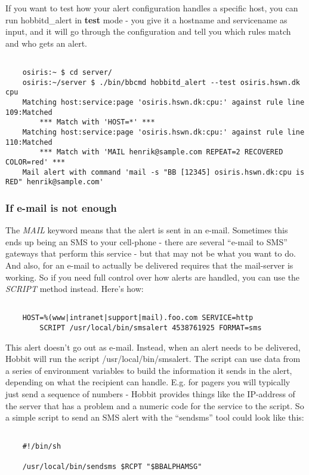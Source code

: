  If you want to test how your alert configuration handles a specific host, you can run hobbitd\_alert in \textbf{test}
 mode - you give it a hostname and servicename as input, and it will go through the configuration and tell you which rules match and who gets an alert.
\begin{verbatim}

	osiris:~ $ cd server/
	osiris:~/server $ ./bin/bbcmd hobbitd_alert --test osiris.hswn.dk cpu
	Matching host:service:page 'osiris.hswn.dk:cpu:' against rule line 109:Matched
	    *** Match with 'HOST=*' ***
	Matching host:service:page 'osiris.hswn.dk:cpu:' against rule line 110:Matched
	    *** Match with 'MAIL henrik@sample.com REPEAT=2 RECOVERED COLOR=red' ***
	Mail alert with command 'mail -s "BB [12345] osiris.hswn.dk:cpu is RED" henrik@sample.com'

\end{verbatim}
\subsubsection*{If e-mail is not enough}


 The \emph{MAIL}
 keyword means that the alert is sent in an e-mail. Sometimes this ends up being an SMS to your cell-phone - there are several ``e-mail to SMS'' gateways that perform this service - but that may not be what you want to do. And also, for an e-mail to actually be delivered requires that the mail-server is working. So if you need full control over how alerts are handled, you can use the \emph{SCRIPT}
 method instead. Here's how: \begin{verbatim}

	HOST=%(www|intranet|support|mail).foo.com SERVICE=http
		SCRIPT /usr/local/bin/smsalert 4538761925 FORMAT=sms

\end{verbatim}



 This alert doesn't go out as e-mail. Instead, when an alert needs to be delivered, Hobbit will run the script /usr/local/bin/smsalert. The script can use data from a series of environment variables to build the information it sends in the alert, depending on what the recipient can handle. E.g. for pagers you will typically just send a sequence of numbers - Hobbit provides things like the IP-address of the server that has a problem and a numeric code for the service to the script. So a simple script to send an SMS alert with the ``sendsms'' tool could look like this:
\begin{verbatim}

	#!/bin/sh

	/usr/local/bin/sendsms $RCPT "$BBALPHAMSG"

\end{verbatim}


